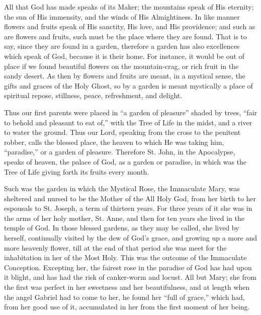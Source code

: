 All that God has made speaks of
its Maker; the mountains speak of His eternity; the sun of His
immensity, and the winds of His Almightiness. In like manner flowers and
fruits speak of His sanctity, His love, and His providence; and such as
are flowers and fruits, such must be the place where they are found.
That is to say, since they are found in a garden, therefore a garden has
also excellences which speak of God, because it is their home. For
instance, it would be out of place if we found beautiful flowers on the
mountain-crag, or rich fruit in the sandy desert. As then by flowers and
fruits are meant, in a mystical sense, the gifts and graces of the Holy
Ghost, so by a garden is meant mystically a place of spiritual repose,
stillness, peace, refreshment, and delight.

Thus our first parents were
placed in ``a garden of pleasure'' shaded by trees, ``fair to behold and
pleasant to eat of,'' with the Tree of Life in the midst, and a river to
water the ground. Thus our Lord, speaking from the cross to the penitent
robber, calls the blessed place, the heaven to which He was taking him, ``paradise,''
or a garden of pleasure. Therefore St. John, in the Apocalypse, speaks
of heaven, the palace of God, as a garden or paradise, in which was the
Tree of Life giving forth its fruits every month.

Such was the garden in which the
Mystical Rose, the Immaculate Mary, was sheltered and nursed to be the
Mother of the All Holy God, from her birth to her espousals to St.
Joseph, a term of thirteen years. For three years of it she was in the
arms of her holy mother, St. Anne, and then for ten years she lived in
the temple of God. In those blessed gardens, as they may be called, she
lived by herself, continually visited by the dew of God's grace, and
growing up a more and more heavenly flower, till at the end of that
period she was meet for the inhabitation in her of the Most Holy. This
was the outcome of the Immaculate Conception. Excepting her, the fairest
rose in the paradise of God has had upon it blight, and has had the risk
of canker-worm and locust. All but Mary; she from the first was perfect
in her sweetness and her beautifulness, and at length when the angel
Gabriel had to come to her, he found her ``full of grace,'' which had,
from her good use of it, accumulated in her from the first moment of her
being.



